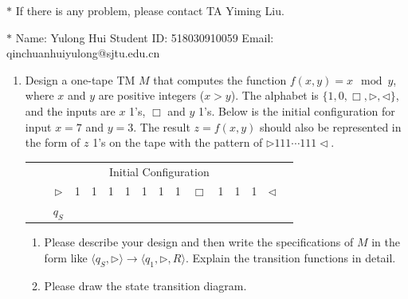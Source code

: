 \documentclass[12pt,a4paper]{article}
\theoremstyle{definition}
\begin{document}
	\noindent
	
	\noindent{}
	\begin{center}
		\footnotesize{\color{red}$*$ If there is any problem, please contact TA Yiming Liu. }
		
		\footnotesize{\color{blue}$*$ Name: Yulong Hui  \quad Student ID: 518030910059 \quad Email: qinchuanhuiyulong@sjtu.edu.cn}
	\end{center}
	
	\begin{enumerate}
		
		\item
		Design a one-tape TM $M$ that computes the function $f(x, y) = x \mod y$, where $x$ and $y$ are positive integers ($x > y$). The alphabet is $\{1, 0, \Box, \triangleright, \triangleleft\}$, and the inputs are $x$ 1's, $\Box$ and $y$ 1's. Below is the initial configuration for input $x=7$ and $y=3$. The result $z=f(x, y)$ should also be represented in the form of $z$ 1's on the tape with the pattern of $\triangleright 111 \cdots 111 \triangleleft$.
		\begin{center}
			\begin{tabular}{ll|c|c|c|c|c|c|c|c|c|c|c|c|c|c}
				& \multicolumn{14}{c}{Initial Configuration} \\ [5pt]
				\cline{2-16}
				& & $\triangleright$ &  1  & 1 & 1 & 1 & 1 & 1 & 1 & $\Box$ & 1 & 1 & 1 & $ \triangleleft$ & \\
				\cline{2-16}
				\multicolumn{2}{c}{} & \multicolumn{1}{c}{$q_S$} & \multicolumn{11}{c}{}	
			\end{tabular}
		\end{center}
		
		\begin{enumerate}
			\item
			Please describe your design and then write the specifications of $M$ in the form like $\langle q_S, \triangleright \rangle \rightarrow \langle q_1, \triangleright,  R\rangle$. Explain the transition functions in detail.
			
			\item
			Please draw the state transition diagram.
			

\end{enumerate}
\end{enumerate}
\end{document}
